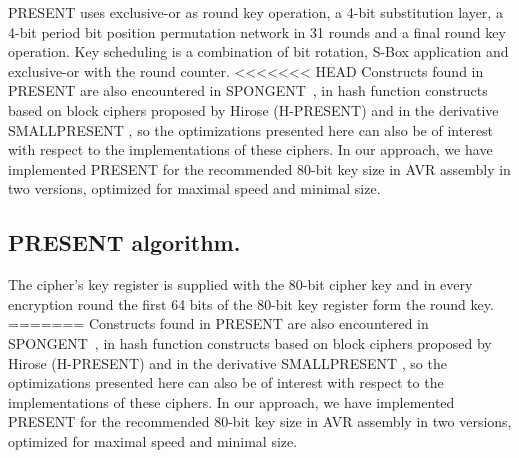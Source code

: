 \documentclass[11pt]{article}
\begin{document}
PRESENT uses exclusive-or as round key operation, a 4-bit substitution layer, a 4-bit period bit position permutation network in 31 rounds and a final round key operation.
Key scheduling is a combination of bit rotation, S-Box application and exclusive-or with the round counter.
<<<<<<< HEAD
Constructs found in PRESENT are also encountered in SPONGENT~\cite{bogdanov2011spongent}, in hash function constructs based on block ciphers proposed by Hirose \cite{bogdanov2008hash,hirose2005provably,hirose2006some} (H-PRESENT) and in the derivative SMALLPRESENT \cite{leander2010small}, so the optimizations presented here can also be of interest with respect to the implementations of these ciphers. In our approach, we have implemented PRESENT for the recommended 80-bit key size in AVR assembly in two versions, optimized for maximal speed and minimal size.
\subsection{PRESENT algorithm.}
The cipher's key register is supplied with the 80-bit cipher key and in every encryption round the first 64 bits of the 80-bit key register form the round key.
=======
Constructs found in PRESENT are also encountered in SPONGENT~\cite{bogdanov2011spongent}, in hash function constructs based on block ciphers proposed by Hirose \cite{bogdanov2008hash,hirose2005provably,hirose2006some} (H-PRESENT) and in the derivative SMALLPRESENT \cite{leander2010small}, so the optimizations presented here can also be of interest with respect to the implementations of these ciphers. In our approach, we have implemented PRESENT for the recommended 80-bit key size in AVR assembly in two versions, optimized for maximal speed and minimal size.\\

\end{document}
